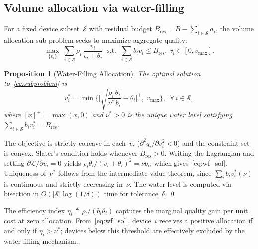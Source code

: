 \documentclass[a4paper,fleqn]{cas-dc}
\newtheorem{proposition}{Proposition}
\newcommand{\Sset}{\mathcal{S}}
\newcommand{\vmax}{v_{\max}}
\newcommand{\Bres}{B_{\mathrm{res}}}
\begin{document}
	\subsection{Volume allocation via water-filling}\label{sec:waterfill}
	
	For a fixed device subset~$\Sset$ with residual budget
	$\Bres = B - \sum_{i \in \Sset} a_i$, the volume allocation
	sub-problem seeks to maximize aggregate quality:
	\begin{equation}\label{eq:subproblem}
		\max_{\{v_i\}} \;
		\sum_{i \in \Sset} \rho_i \,\frac{v_i}{v_i + \theta_i}
		\;\;\text{s.t.}\;\;
		\sum_{i \in \Sset} b_i v_i \leq \Bres,\;
		v_i \in [0, \vmax].
	\end{equation}
	
	\begin{proposition}[Water-Filling Allocation]\label{prop:wf}
		The optimal solution to~\eqref{eq:subproblem} is
		\begin{equation}\label{eq:wf_sol}
			v_i^* = \min\!\Biggl\{
			\Biggl[\sqrt{\frac{\rho_i\,\theta_i}{\nu^*\, b_i}}
			- \theta_i \Biggr]^{\!+}\!,\; \vmax
			\Biggr\}, \;\; \forall\, i \in \Sset,
		\end{equation}
		where $[x]^+ = \max(x, 0)$ and $\nu^* > 0$ is the unique water
		level satisfying $\sum_{i \in \Sset} b_i v_i^* = \Bres$.
	\end{proposition}
	
	\begin{pf}
		The objective is strictly concave in each~$v_i$
		($\partial^2 q_i / \partial v_i^2 < 0$) and the constraint set is
		convex.  Slater's condition holds whenever $\Bres > 0$.  Writing the
		Lagrangian and setting $\partial \mathcal{L} / \partial v_i = 0$
		yields $\rho_i \theta_i / (v_i + \theta_i)^2 = \nu b_i$, which
		gives~\eqref{eq:wf_sol}.  Uniqueness of~$\nu^*$ follows from the
		intermediate value theorem, since
		$\sum_i b_i v_i^*(\nu)$ is continuous and strictly decreasing
		in~$\nu$.  The water level is computed via bisection in
		$O(|\Sset|\log(1/\delta))$ time for tolerance~$\delta$.
		\qed\end{pf}
	
	The efficiency index
	$\eta_i \triangleq \rho_i / (b_i \theta_i)$ captures the marginal
	quality gain per unit cost at zero allocation.
	From~\eqref{eq:wf_sol}, device~$i$ receives a positive allocation if
	and only if $\eta_i > \nu^*$; devices below this threshold are
	effectively excluded by the water-filling mechanism.
	
\end{document}

